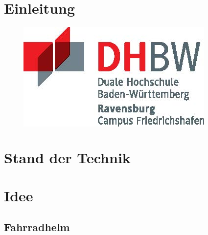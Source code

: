 \documentclass[a4paper, 12pt]{article} %
\begin{document}
\section{Einleitung}
\begin{spacing}{1.8}  %
    \fontsize{14pt}{15pt}\selectfont  %

    



\begin{figure}[H]
    \includegraphics[width=0.5\linewidth]{images/DHBW_d_R_FN_46mm_4c.jpg}\\[1ex] 
    \centering
    \caption{}
    \label{ABBILDUNG 1}
\end{figure}

\end{spacing}

\clearpage

\section{Stand der Technik}


\begin{spacing}{1.8}  %
\fontsize{14pt}{15pt}\selectfont  %


\end{spacing}

\clearpage

\section{Idee}


\begin{spacing}{1.8}  %
\fontsize{14pt}{15pt}\selectfont  %


\end{spacing}

\clearpage

\subsection{Fahrradhelm}
\end{document}
